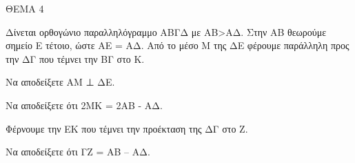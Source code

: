 
ΘΕΜΑ 4

Δίνεται ορθογώνιο παραλληλόγραμμο ΑΒΓΔ με ΑΒ\textgreater ΑΔ. Στην ΑΒ θεωρούμε σημείο Ε τέτοιο, ώστε ΑΕ = ΑΔ. Από το μέσο Μ της ΔΕ φέρουμε παράλληλη προς την ΔΓ που τέμνει την ΒΓ στο Κ.

\begin{alist}
\item Να αποδείξετε ΑΜ ⊥ ΔΕ. 

\item Να αποδείξετε ότι 2ΜΚ = 2ΑΒ - ΑΔ. 

\item Φέρνουμε την ΕΚ που τέμνει την προέκταση της ΔΓ στο Ζ.

Να αποδείξετε ότι ΓΖ = ΑΒ -- ΑΔ. 
\end{alist}
